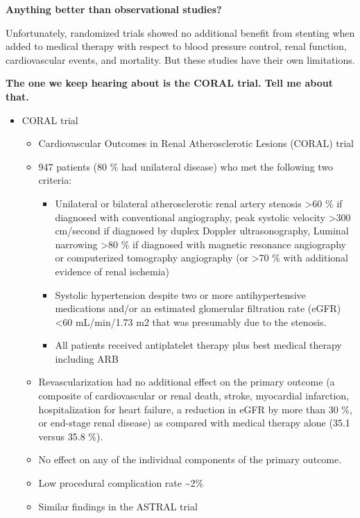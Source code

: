 \documentclass[
]{book}
\begin{document}
\textbf{Anything better than observational studies?}

Unfortunately, randomized trials showed no additional benefit from
stenting when added to medical therapy with respect to blood pressure
control, renal function, cardiovascular events, and mortality. But these
studies have their own limitations.

\textbf{The one we keep hearing about is the CORAL trial. Tell me about
that.}

\begin{itemize}
\item
  CORAL trial \citep{cooperStentingMedicalTherapy2014}

  \begin{itemize}
  \item
    Cardiovascular Outcomes in Renal Atherosclerotic Lesions (CORAL)
    trial
  \item
    947 patients (80 \% had unilateral disease) who met the following
    two criteria:

    \begin{itemize}
    \item
      Unilateral or bilateral atherosclerotic renal artery
      stenosis \textgreater60 \% if diagnosed with conventional angiography,
      peak systolic velocity \textgreater300 cm/second if diagnosed by
      duplex Doppler ultrasonography, Luminal narrowing \textgreater80 \% if
      diagnosed with magnetic resonance angiography or
      computerized tomography angiography (or \textgreater70 \% with
      additional evidence of renal ischemia)
    \item
      Systolic hypertension despite two or more antihypertensive
      medications and/or an estimated glomerular filtration rate
      (eGFR) \textless60 mL/min/1.73 m2 that was presumably due to the
      stenosis.
    \item
      All patients received antiplatelet therapy plus best medical
      therapy including ARB
    \end{itemize}
  \item
    Revascularization had no additional effect on the primary
    outcome (a composite of cardiovascular or renal death, stroke,
    myocardial infarction, hospitalization for heart failure, a
    reduction in eGFR by more than 30 \%, or end-stage renal disease)
    as compared with medical therapy alone (35.1 versus 35.8 \%).
  \item
    No effect on any of the individual components of the primary
    outcome.
  \item
    Low procedural complication rate \textasciitilde2\%
  \item
    Similar findings in the ASTRAL trial
    \citep{astralinvestigatorsRevascularizationMedicalTherapy2009}
  \end{itemize}
\end{itemize}
\end{document}
